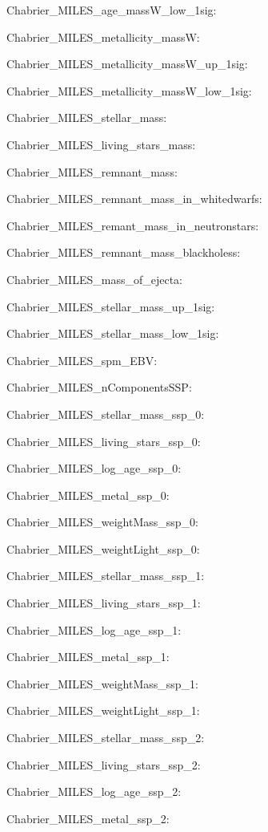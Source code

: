 \item Chabrier\_MILES\_age\_massW\_low\_1sig: 
\item Chabrier\_MILES\_metallicity\_massW: 
\item Chabrier\_MILES\_metallicity\_massW\_up\_1sig: 
\item Chabrier\_MILES\_metallicity\_massW\_low\_1sig: 
\item Chabrier\_MILES\_stellar\_mass: 
\item Chabrier\_MILES\_living\_stars\_mass: 
\item Chabrier\_MILES\_remnant\_mass: 
\item Chabrier\_MILES\_remnant\_mass\_in\_whitedwarfs: 
\item Chabrier\_MILES\_remant\_mass\_in\_neutronstars: 
\item Chabrier\_MILES\_remnant\_mass\_blackholess: 
\item Chabrier\_MILES\_mass\_of\_ejecta: 
\item Chabrier\_MILES\_stellar\_mass\_up\_1sig: 
\item Chabrier\_MILES\_stellar\_mass\_low\_1sig: 
\item Chabrier\_MILES\_spm\_EBV: 
\item Chabrier\_MILES\_nComponentsSSP: 
\item Chabrier\_MILES\_stellar\_mass\_ssp\_0: 
\item Chabrier\_MILES\_living\_stars\_ssp\_0: 
\item Chabrier\_MILES\_log\_age\_ssp\_0: 
\item Chabrier\_MILES\_metal\_ssp\_0: 
\item Chabrier\_MILES\_weightMass\_ssp\_0: 
\item Chabrier\_MILES\_weightLight\_ssp\_0: 
\item Chabrier\_MILES\_stellar\_mass\_ssp\_1: 
\item Chabrier\_MILES\_living\_stars\_ssp\_1: 
\item Chabrier\_MILES\_log\_age\_ssp\_1: 
\item Chabrier\_MILES\_metal\_ssp\_1: 
\item Chabrier\_MILES\_weightMass\_ssp\_1: 
\item Chabrier\_MILES\_weightLight\_ssp\_1: 
\item Chabrier\_MILES\_stellar\_mass\_ssp\_2: 
\item Chabrier\_MILES\_living\_stars\_ssp\_2: 
\item Chabrier\_MILES\_log\_age\_ssp\_2: 
\item Chabrier\_MILES\_metal\_ssp\_2: 

